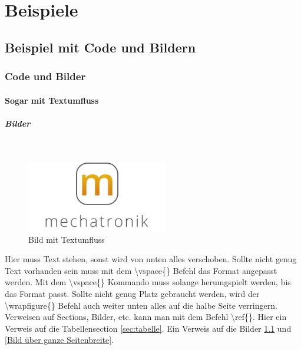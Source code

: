 \chapter{Beispiele}

\section{Beispiel mit Code und Bildern}
\label{sec:beispiel}

\subsection{Code und Bilder}
\label{sec:code-bild}

\subsubsection{Sogar mit Textumfluss}
\label{sec:floating-text}

\paragraph{Bilder}\mbox{}\\

\begin{figure}
\vspace{-30pt}
  \begin{center}
    \includegraphics[width=0.55\textwidth]{fig/logoMecha}
  \end{center}
  \caption{Bild mit Textumfluss}
  \label{Bild mit Textumfluss}
  \vspace{-10pt}
\end{figure}

Hier muss Text stehen, sonst wird von unten alles verschoben. Sollte nicht genug Text vorhanden sein muss mit dem \textbackslash{}vspace\{\} Befehl das Format angepasst werden. Mit dem \textbackslash{}vspace\{\} Kommando muss solange herumgspielt werden, bis das Format passt. Sollte nicht genug Platz gebraucht werden, wird der \textbackslash{}wrapfigure\{\} Befehl auch weiter unten alles auf die halbe Seite verringern. Verweisen auf Sections, Bilder, etc. kann man mit dem Befehl \textbackslash{}ref\{\}. Hier ein Verweis auf die Tabellensection \ref{sec:tabelle}. Ein Verweis auf die Bilder \ref{Bild mit Textumfluss} und \ref{Bild über ganze Seitenbreite}.

